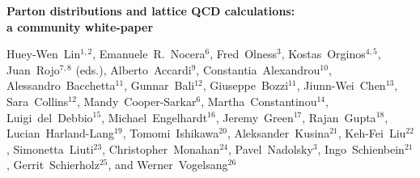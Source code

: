 \documentclass[11pt,a4paper]{article}
\numberwithin{equation}{section}
\numberwithin{figure}{section}
\numberwithin{table}{section}
\begin{document}
\vspace{.3cm}

\begin{center}
{\Large \bf Parton distributions and lattice QCD calculations:\\[0.2cm] a community white-paper}
\vspace{.4cm}

{\small 
  Huey-Wen~Lin$^{1,2}$,
  Emanuele~R.~Nocera$^6$,
  Fred~Olness$^3$,
  Kostas~Orginos$^{4,5}$,
  Juan~Rojo$^{7,8}$ (eds.),
Alberto~Accardi$^9$, 
Constantia~Alexandrou$^{10}$, 
Alessandro~Bacchetta$^{11}$, 
Gunnar~Bali$^{12}$, 
Giuseppe~Bozzi$^{11}$, 
Jiunn-Wei~Chen$^{13}$, 	
Sara~Collins$^{12}$, 	
Mandy~Cooper-Sarkar$^{6}$, 
Martha~Constantinou$^{14}$, 
Luigi~del~Debbio$^{15}$, 
Michael~Engelhardt$^{16}$, 
Jeremy~Green$^{17}$, 
Rajan~Gupta$^{18}$, 
Lucian~Harland-Lang$^{19}$, 
Tomomi~Ishikawa$^{20}$, 
Aleksander~Kusina$^{21}$, 
Keh-Fei~Liu$^{22}$, 	
Simonetta~Liuti$^{23}$, 		
Christopher~Monahan$^{24}$, 		
Pavel~Nadolsky$^{3}$, 
Ingo~Schienbein$^{21}$, 	
Gerrit~Schierholz$^{25}$, and
Werner~Vogelsang$^{26}$
}


\end{center}
\end{document}
